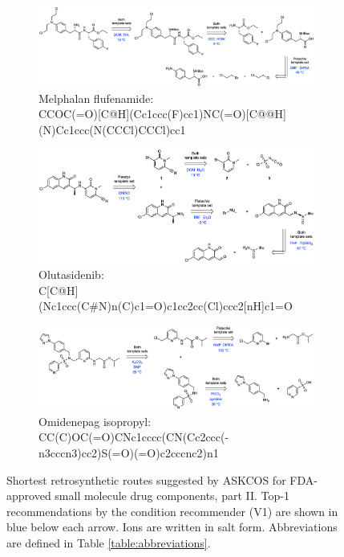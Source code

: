 \documentclass[pdflatex,sn-mathphys-num]{sn-jnl}%
\theoremstyle{thmstyleone}%
\theoremstyle{thmstyletwo}%
\theoremstyle{thmstylethree}%
\begin{document}
\begin{figure}[h!]
    \captionsetup[subfigure]{labelformat=empty}
    \begin{subfigure}[t]{1.0\textwidth}
        \includegraphics[scale=0.725]{media/SI_study/5.melphalan_flufenamide.png}
        \caption{Melphalan flufenamide: \\ \small CCOC(=O)[C@H](Cc1ccc(F)cc1)NC(=O)[C@@H](N)Cc1ccc(N(CCCl)CCCl)cc1}
    \end{subfigure}
    \hfill
    \vspace{1cm}
    \begin{subfigure}[t]{1.0\textwidth}
        \includegraphics[scale=0.725]{media/SI_study/6.olutasidenib.png}
        \caption{Olutasidenib: \\ \small C[C@H](Nc1ccc(C\#N)n(C)c1=O)c1cc2cc(Cl)ccc2[nH]c1=O}
    \end{subfigure}
    \hfill
    \vspace{1cm}
    \begin{subfigure}[t]{1.0\textwidth}
        \includegraphics[scale=0.725]{media/SI_study/7.omidenepag_isopropyl.png}
        \caption{Omidenepag isopropyl: \\ \small CC(C)OC(=O)CNc1cccc(CN(Cc2ccc(-n3cccn3)cc2)S(=O)(=O)c2cccnc2)n1}
    \end{subfigure}
    \hfill
    \caption{Shortest retrosynthetic routes suggested by ASKCOS for FDA-approved small molecule drug components, part II. Top-1 recommendations by the condition recommender (V1) are shown in blue below each arrow. Ions are written in salt form. Abbreviations are defined in Table \ref{table:abbreviations}.}
    \label{fig:fda_study_2}
\end{figure}
\end{document}
